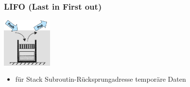 \begin{multicols}{3}
\begin{minipage}{\linewidth}
    \subsubsection{LIFO (Last in First out)}
        \includegraphics[height=2.5cm]{images/SystembusSpeicherSpeichersystem/SpeicherSysLIFO}
    \begin{itemize}
        \item für Stack
        \subitem Subroutin-Rücksprungadresse
        \subitem temporäre Daten
    \end{itemize}
\end{minipage}
\end{multicols}

